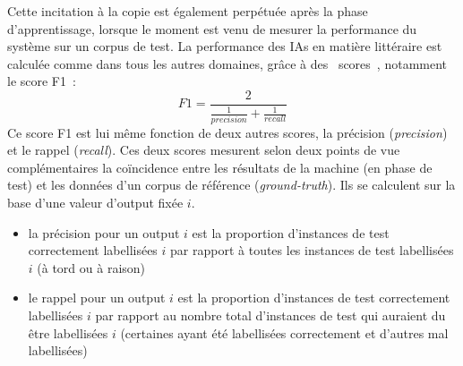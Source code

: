 \documentclass{article}
\begin{document}
					Cette incitation à la copie est également perpétuée après la phase d'apprentissage, lorsque le moment est venu de mesurer la performance du système sur un corpus de test. La performance des IAs en matière littéraire est calculée comme dans tous les autres domaines, grâce à des \guillemotleft~scores~\guillemotright, notamment le score F1~:
					\begin{equation}
						F1 = \frac{2}{\frac{1}{precision}+\frac{1}{recall}}
					\end{equation}
					Ce score F1 est lui même fonction de deux autres scores, la précision (\textit{precision}) et le rappel (\textit{recall}). Ces deux scores mesurent selon deux points de vue complémentaires la coïncidence entre les résultats de la machine (en phase de test) et les données d'un corpus de référence (\textit{ground-truth}). Ils se calculent sur la base d'une valeur d'output fixée $i$. 
					\vspace{2mm}
					\begin{itemize}
						\item la précision pour un output $i$ est la proportion d'instances de test correctement labellisées $i$ par rapport à toutes les instances de test labellisées $i$ (à tord ou à raison)
						\item le rappel pour un output $i$ est la proportion d'instances de test correctement labellisées $i$ par rapport au nombre total d'instances de test qui auraient du être labellisées $i$ (certaines ayant été labellisées correctement et d'autres mal labellisées)
					\end{itemize}
					\vspace{2mm}
\end{document}
